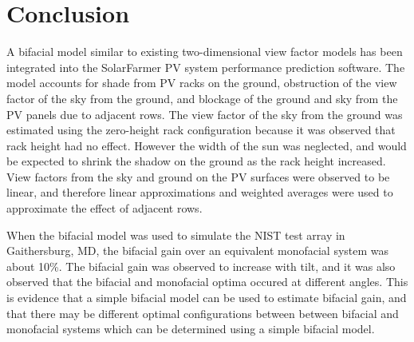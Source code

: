 \documentclass[conference]{IEEEtran}
\begin{document}

\section{Conclusion}
A bifacial model similar to existing two-dimensional view factor models has been integrated into the SolarFarmer PV system performance prediction software.  The model accounts for shade from PV racks on the ground, obstruction of the view factor of the sky from the ground, and blockage of the ground and sky from the PV panels due to adjacent rows.  The view factor of the sky from the ground was estimated using the zero-height rack configuration because it was observed that rack height had no effect.  However the width of the sun was neglected, and would be expected to shrink the shadow on the ground as the rack height increased.  View factors from the sky and ground on the PV surfaces were observed to be linear, and therefore linear approximations and weighted averages were used to approximate the effect of adjacent rows.

When the bifacial model was used to simulate the NIST test array in Gaithersburg, MD, the bifacial gain over an equivalent monofacial system was about 10\%.  The bifacial gain was observed to increase with tilt,  and it was also observed that the bifacial and monofacial optima occured at different angles.  This is evidence that a simple bifacial model can be used to estimate bifacial gain, and that there may be different optimal configurations between between bifacial and monofacial systems which can be determined using a simple bifacial model.






%

\vfil\eject

\end{document}
